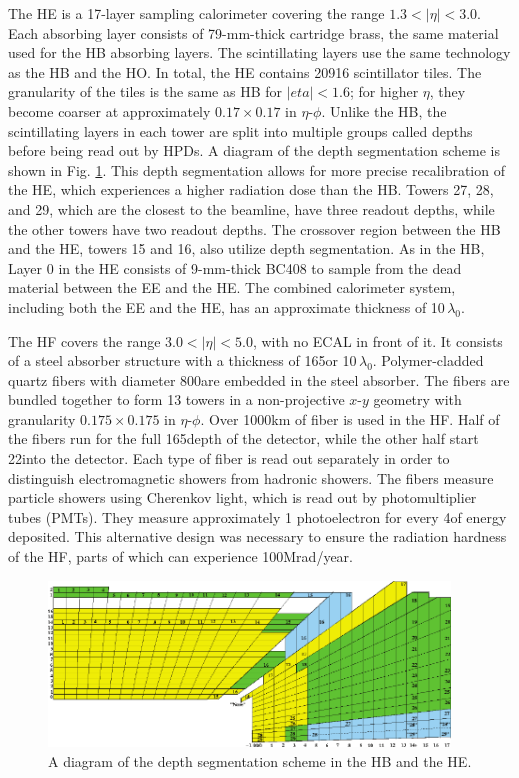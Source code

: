 The HE is a 17-layer sampling calorimeter covering the range $1.3<|\eta|<3.0$. Each absorbing layer consists of 79-mm-thick cartridge brass, the same material used for the HB absorbing layers. The scintillating layers use the same technology as the HB and the HO. In total, the HE contains 20916 scintillator tiles. The granularity of the tiles is the same as HB for $|eta|<1.6$; for higher $\eta$, they become coarser at approximately $0.17\times0.17$ in $\eta$-$\phi$. Unlike the HB, the scintillating layers in each tower are split into multiple groups called depths before being read out by HPDs. A diagram of the depth segmentation scheme is shown in Fig. \ref{fig:hcal-depths}. This depth segmentation allows for more precise recalibration of the HE, which experiences a higher radiation dose than the HB. Towers 27, 28, and 29, which are the closest to the beamline, have three readout depths, while the other towers have two readout depths. The crossover region between the HB and the HE, towers 15 and 16, also utilize depth segmentation. As in the HB, Layer 0 in the HE consists of 9-mm-thick BC408 to sample from the dead material between the EE and the HE. The combined calorimeter system, including both the EE and the HE, has an approximate thickness of 10$\,\lambda_{0}$.

The HF covers the range $3.0<|\eta|<5.0$, with no ECAL in front of it. It consists of a steel absorber structure with a thickness of 165\cm or 10$\,\lambda_{0}$. Polymer-cladded quartz fibers with diameter 800\mum are embedded in the steel absorber. The fibers are bundled together to form 13 towers in a non-projective $x$-$y$ geometry with granularity $0.175\times0.175$ in $\eta$-$\phi$. Over 1000\unit{km} of fiber is used in the HF. Half of the fibers run for the full 165\cm depth of the detector, while the other half start 22\cm into the detector. Each type of fiber is read out separately in order to distinguish electromagnetic showers from hadronic showers. The fibers measure particle showers using Cherenkov light, which is read out by photomultiplier tubes (PMTs). They measure approximately 1 photoelectron for every 4\GeV of energy deposited. This alternative design was necessary to ensure the radiation hardness of the HF, parts of which can experience 100\unit{Mrad/year}.

\begin{figure}[hbt]
\begin{center}
\includegraphics[width=0.95\textwidth]{figures/HCAL_tower_segmentation.pdf}
\caption{A diagram of the depth segmentation scheme in the HB and the HE.}
\label{fig:hcal-depths}
\end{center}
\end{figure}

